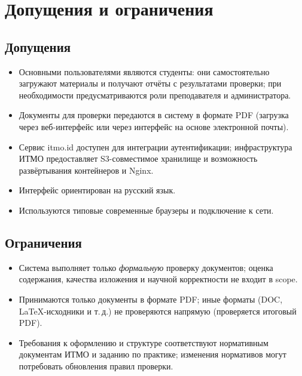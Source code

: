\section{Допущения и ограничения}

\subsection{Допущения}

\begin{itemize}
  \item Основными пользователями являются студенты: они самостоятельно загружают материалы и получают отчёты с результатами проверки; при необходимости предусматриваются роли преподавателя и администратора.
  \item Документы для проверки передаются в систему в формате PDF (загрузка через веб-интерфейс или через интерфейс на основе электронной почты).
  \item Сервис itmo.id доступен для интеграции аутентификации; инфраструктура ИТМО предоставляет S3-совместимое хранилище и возможность развёртывания контейнеров и Nginx.
  \item Интерфейс ориентирован на русский язык.
  \item Используются типовые современные браузеры и подключение к сети.
\end{itemize}

\subsection{Ограничения}

\begin{itemize}
  \item Система выполняет только \emph{формальную} проверку документов; оценка содержания, качества изложения и научной корректности не входит в scope.
  \item Принимаются только документы в формате PDF; иные форматы (DOC, LaTeX-исходники и т.\,д.) не проверяются напрямую (проверяется итоговый PDF).
  \item Требования к оформлению и структуре соответствуют нормативным документам ИТМО и заданию по практике; изменения нормативов могут потребовать обновления правил проверки.
\end{itemize}
